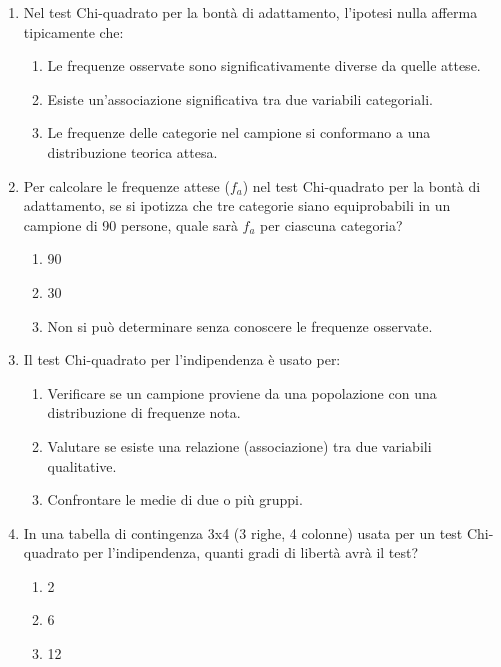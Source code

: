 \documentclass[12pt, a4paper]{article}
\newcommand{\fa}{f_a} %
\begin{document}
\begin{enumerate}
    \item Nel test Chi-quadrato per la bontà di adattamento, l'ipotesi nulla afferma tipicamente che:
    \begin{enumerate}
        \item Le frequenze osservate sono significativamente diverse da quelle attese.
        \item Esiste un'associazione significativa tra due variabili categoriali.
        \item Le frequenze delle categorie nel campione si conformano a una distribuzione teorica attesa.
    \end{enumerate}
    \vspace{0.5cm}

    \item Per calcolare le frequenze attese ($\fa$) nel test Chi-quadrato per la bontà di adattamento, se si ipotizza che tre categorie siano equiprobabili in un campione di 90 persone, quale sarà $\fa$ per ciascuna categoria?
    \begin{enumerate}
        \item 90
        \item 30
        \item Non si può determinare senza conoscere le frequenze osservate.
    \end{enumerate}
    \vspace{0.5cm}

    \item Il test Chi-quadrato per l'indipendenza è usato per:
    \begin{enumerate}
        \item Verificare se un campione proviene da una popolazione con una distribuzione di frequenze nota.
        \item Valutare se esiste una relazione (associazione) tra due variabili qualitative.
        \item Confrontare le medie di due o più gruppi.
    \end{enumerate}
    \vspace{0.5cm}

    \item In una tabella di contingenza 3x4 (3 righe, 4 colonne) usata per un test Chi-quadrato per l'indipendenza, quanti gradi di libertà avrà il test?
    \begin{enumerate}
        \item 2
        \item 6
        \item 12
    \end{enumerate}
    \vspace{0.5cm}


\end{enumerate}
\end{document}
